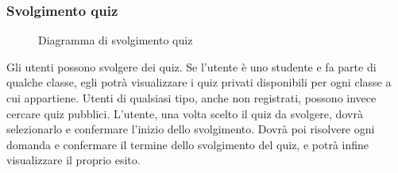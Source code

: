 \documentclass[a4paper, titlepage]{article}
\begin{document}
\subsubsection{Svolgimento quiz}
\begin{figure}[H]
	\centering
	\noindent{}
	\caption{Diagramma di svolgimento quiz}
\end{figure}
Gli utenti possono svolgere dei quiz. Se l’utente è uno studente e fa parte di qualche classe, egli potrà visualizzare i quiz privati disponibili per ogni classe a cui appartiene.
Utenti di qualsiasi tipo, anche non registrati, possono invece cercare quiz pubblici. 
L’utente, una volta scelto il quiz da svolgere, dovrà selezionarlo e confermare l’inizio dello svolgimento. Dovrà poi risolvere ogni domanda e confermare il termine dello svolgimento del quiz, e potrà infine visualizzare il proprio esito.
\end{document}

